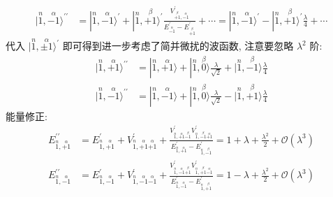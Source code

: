 \documentclass[../../main.tex]{subfiles}
\begin{document}
\begin{enumerate}
\begin{align*}
        |\stackrel{n}{1},\stackrel{\alpha}{-1}\rangle^{\prime\prime} &= |\stackrel{n}{1},\stackrel{\alpha}{-1}\rangle^{\prime} + |\stackrel{n}{1},\stackrel{\beta}{+1}\rangle^{\prime}\frac{V^{\prime}_{\stackrel{\beta}{+1},\stackrel{\alpha}{-1}}}{E^{\prime}_{\stackrel{\alpha}{-1}} - E^{\prime}_{\stackrel{\beta}{+1}}} + \cdots
        = |\stackrel{n}{1},\stackrel{\alpha}{-1}\rangle^{\prime} - |\stackrel{n}{1},\stackrel{\beta}{+1}\rangle^{\prime}\frac{\lambda}{4} + \cdots
    \end{align*}
    代入 $|\stackrel{n}{1},\stackrel{\alpha}{\pm 1}\rangle^{\prime}$ 即可得到进一步考虑了简并微扰的波函数, 注意要忽略 $\lambda^{2}$ 阶:
    \begin{align*}
        |\stackrel{n}{1},\stackrel{\alpha}{+1}\rangle^{\prime\prime} &= |\stackrel{n}{1},\stackrel{\alpha}{+1}\rangle + |\stackrel{n}{1},\stackrel{\beta}{0}\rangle\frac{\lambda}{\sqrt{2}} + |\stackrel{n}{1},\stackrel{\beta}{-1}\rangle\frac{\lambda}{4}\\
        |\stackrel{n}{1},\stackrel{\alpha}{-1}\rangle^{\prime\prime} &= |\stackrel{n}{1},\stackrel{\alpha}{-1}\rangle + |\stackrel{n}{1},\stackrel{\beta}{0}\rangle\frac{\lambda}{\sqrt{2}} - |\stackrel{n}{1},\stackrel{\beta}{+1}\rangle\frac{\lambda}{4}
    \end{align*}
    能量修正:
    \begin{align*}
        E^{\prime\prime}_{\stackrel{n}{1},\stackrel{\alpha}{+1}} &= E^{\prime}_{\stackrel{n}{1},\stackrel{\alpha}{+1}} + V^{\prime}_{\stackrel{n}{1},\stackrel{\alpha}{+1}\stackrel{\alpha}{+1}} + \frac{V^{\prime}_{\stackrel{n}{1},\stackrel{\alpha}{+1}\stackrel{\beta}{-1}}V^{\prime}_{\stackrel{n}{1},\stackrel{\beta}{-1}\stackrel{\alpha}{+1}}}{E^{\prime}_{\stackrel{n}{1},\stackrel{\alpha}{+1}} - E^{\prime}_{\stackrel{n}{1},\stackrel{\beta}{-1}}} = 1 + \lambda + \frac{\lambda^{2}}{2} + \mathcal{O}(\lambda^{3})\\
        E^{\prime\prime}_{\stackrel{n}{1},\stackrel{\alpha}{-1}} &= E^{\prime}_{\stackrel{n}{1},\stackrel{\alpha}{-1}} + V^{\prime}_{\stackrel{n}{1},\stackrel{\alpha}{-1}\stackrel{\alpha}{-1}} + \frac{V^{\prime}_{\stackrel{n}{1},\stackrel{\alpha}{-1}\stackrel{\beta}{+1}}V^{\prime}_{\stackrel{n}{1},\stackrel{\beta}{+1}\stackrel{\alpha}{-1}}}{E^{\prime}_{\stackrel{n}{1},\stackrel{\alpha}{-1}} - E^{\prime}_{\stackrel{n}{1},\stackrel{\beta}{+1}}} = 1 - \lambda + \frac{\lambda^{2}}{2} + \mathcal{O}(\lambda^{3})
    \end{align*}
\end{enumerate}
\end{document}
